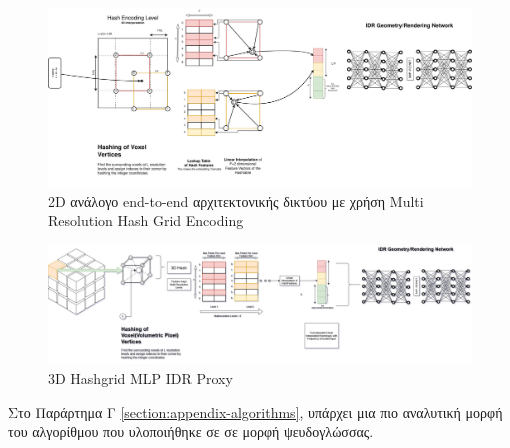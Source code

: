     \begin{figure}[H]
        \centering
        \includegraphics[width = \linewidth]{images/chapter4_img/IDR_Embeddings_Architecture-2D Hasgrid Encoding Net.drawio.jpg}
        \caption{2D ανάλογο end-to-end αρχιτεκτονικής δικτύου με χρήση Multi Resolution Hash Grid Encoding }
        \label{fig:2dhashgrid}
    \end{figure}
    
    \begin{figure}[H]
        \centering
        \includegraphics[width = \linewidth]{images/chapter4_img/IDR_Embeddings_Architecture-3D Hashgrid Embedding Net Equivalent.jpg}
        \caption{3D Hashgrid MLP IDR Proxy}
        \label{fig:hasgridmlp}
    \end{figure}

\par
    Στο Παράρτημα Γ \ref{section:appendix-algorithms}, υπάρχει μια πιο αναλυτική μορφή του αλγορίθμου που υλοποιήθηκε σε  σε μορφή ψευδογλώσσας.
